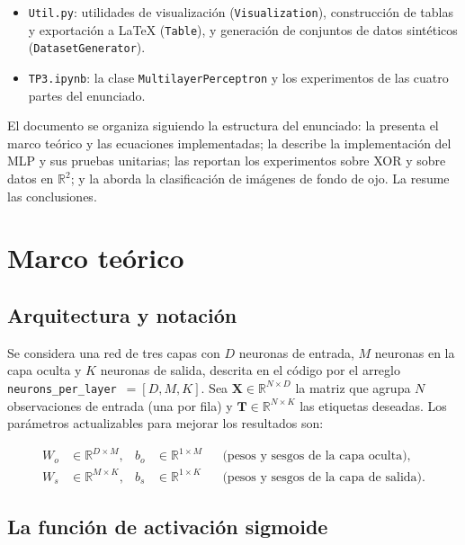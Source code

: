 \documentclass[11pt,a4paper]{article}
\begin{document}
\begin{itemize}[nosep]
  \item \texttt{Util.py}: utilidades de visualización
        (\texttt{Visualization}), construcción de tablas y exportación a
        \LaTeX{} (\texttt{Table}), y generación de conjuntos de datos
        sintéticos (\texttt{DatasetGenerator}).
  \item \texttt{TP3.ipynb}: la clase \texttt{MultilayerPerceptron} y los
        experimentos de las cuatro partes del enunciado.
\end{itemize}

El documento se organiza siguiendo la estructura del enunciado: la
 presenta el marco teórico y las ecuaciones implementadas; la
 describe la implementación del MLP y sus pruebas unitarias;
las  reportan los experimentos sobre XOR y sobre
datos en $\mathbb{R}^2$; y la  aborda la clasificación de
imágenes de fondo de ojo. La  resume las conclusiones.

\section{Marco teórico} \label{sec:marco}

\subsection{Arquitectura y notación}

Se considera una red de tres capas con $D$ neuronas de entrada, $M$ neuronas en
la capa oculta y $K$ neuronas de salida, descrita en el código por el arreglo
\texttt{neurons\_per\_layer}~$=[D,M,K]$. Sea
$\mathbf{X}\in\mathbb{R}^{N\times D}$ la matriz que agrupa $N$ observaciones de
entrada (una por fila) y $\mathbf{T}\in\mathbb{R}^{N\times K}$ las etiquetas
deseadas. Los parámetros actualizables para mejorar los resultados son:

\begin{align}
  W_o &\in \mathbb{R}^{D \times M}, &
  b_o &\in \mathbb{R}^{1 \times M}
    &&\text{(pesos y sesgos de la capa oculta),}\\
  W_s &\in \mathbb{R}^{M \times K}, &
  b_s &\in \mathbb{R}^{1 \times K}
    &&\text{(pesos y sesgos de la capa de salida).}
\end{align}

\subsection{La función de activación sigmoide}\label{sec:sigmoide}
\end{document}
